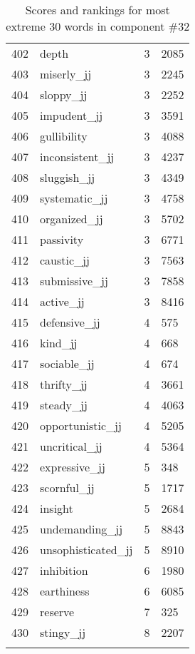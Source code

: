 \begin{longtable}[!htbp]{| rlr@{.}l |}
    402 & depth & 3 & 2085 \\
    403 & miserly\_jj & 3 & 2245 \\
    404 & sloppy\_jj & 3 & 2252 \\
    405 & impudent\_jj & 3 & 3591 \\
    406 & gullibility & 3 & 4088 \\
    407 & inconsistent\_jj & 3 & 4237 \\
    408 & sluggish\_jj & 3 & 4349 \\
    409 & systematic\_jj & 3 & 4758 \\
    410 & organized\_jj & 3 & 5702 \\
    411 & passivity & 3 & 6771 \\
    412 & caustic\_jj & 3 & 7563 \\
    413 & submissive\_jj & 3 & 7858 \\
    414 & active\_jj & 3 & 8416 \\
    415 & defensive\_jj & 4 & 575 \\
    416 & kind\_jj & 4 & 668 \\
    417 & sociable\_jj & 4 & 674 \\
    418 & thrifty\_jj & 4 & 3661 \\
    419 & steady\_jj & 4 & 4063 \\
    420 & opportunistic\_jj & 4 & 5205 \\
    421 & uncritical\_jj & 4 & 5364 \\
    422 & expressive\_jj & 5 & 348 \\
    423 & scornful\_jj & 5 & 1717 \\
    424 & insight & 5 & 2684 \\
    425 & undemanding\_jj & 5 & 8843 \\
    426 & unsophisticated\_jj & 5 & 8910 \\
    427 & inhibition & 6 & 1980 \\
    428 & earthiness & 6 & 6085 \\
    429 & reserve & 7 & 325 \\
    430 & stingy\_jj & 8 & 2207 \\
    \hline
    \caption{Scores and rankings for most extreme 30 words in component \#32} \\
\end{longtable}
